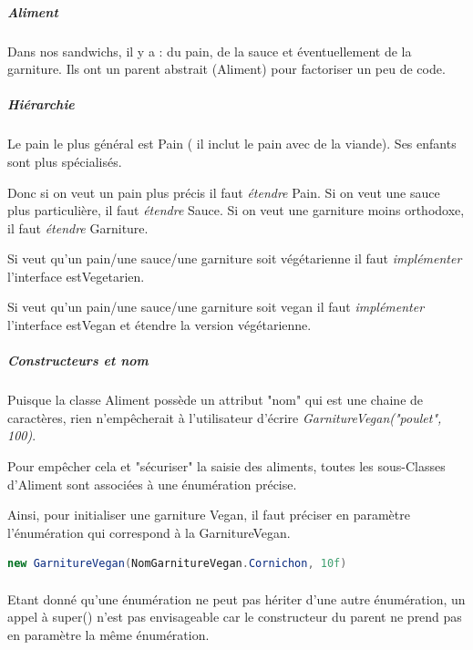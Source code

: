 \documentclass[a4paper]{article}
\begin{document}
\paragraph{}
\subparagraph{Aliment}
Dans nos sandwichs, il y a : du pain, de la sauce et éventuellement de la garniture. Ils ont un parent abstrait (Aliment) pour factoriser un peu de code.

\subparagraph*{Hiérarchie}
Le pain le plus général est Pain ( il inclut le pain avec de la viande). Ses enfants sont plus spécialisés.

Donc si on veut un pain plus précis il faut \emph{étendre} Pain. Si on veut une sauce plus particulière, il faut \emph{étendre} Sauce. Si on veut une garniture moins orthodoxe, il faut \emph{étendre} Garniture.

Si veut qu'un pain/une sauce/une garniture soit végétarienne il faut \emph{implémenter} l'interface estVegetarien.

Si veut qu'un pain/une sauce/une garniture soit vegan il faut \emph{implémenter} l'interface estVegan et étendre la version végétarienne.

\subparagraph*{Constructeurs et nom}

\paragraph{} Puisque la classe Aliment possède un attribut "nom" qui est une chaine de caractères, rien n'empêcherait à l'utilisateur d'écrire \emph{GarnitureVegan("poulet", 100)}.

Pour empêcher cela et "sécuriser" la saisie des aliments, toutes les sous-Classes d'Aliment sont associées à une énumération précise.

Ainsi, pour initialiser une garniture Vegan, il faut préciser en paramètre l'énumération qui correspond à la GarnitureVegan.

\begin{lstlisting}[language=Java, caption=Initialisation GarnitureVegan]
    new GarnitureVegan(NomGarnitureVegan.Cornichon, 10f)
\end{lstlisting}

\paragraph{} Etant donné qu'une énumération ne peut pas hériter d'une autre énumération, un appel à super() n'est pas envisageable car le constructeur du parent ne prend pas en paramètre la même énumération.
\end{document}
